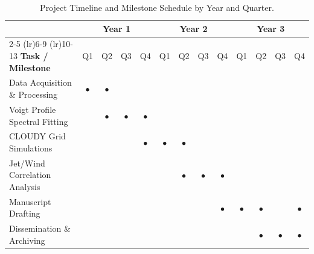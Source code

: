 \begin{table}[htbp]
  \centering
  \caption{Project Timeline and Milestone Schedule by Year and Quarter.}
  \label{tab:timeline}
  \small
  \begin{tabular}{l *{12}{c}}
    \toprule
    & \multicolumn{4}{c}{\textbf{Year 1}} & \multicolumn{4}{c}{\textbf{Year 2}} & \multicolumn{4}{c}{\textbf{Year 3}} \\
    \cmidrule(lr){2-5} \cmidrule(lr){6-9} \cmidrule(lr){10-13}
    \textbf{Task / Milestone} & Q1 & Q2 & Q3 & Q4 & Q1 & Q2 & Q3 & Q4 & Q1 & Q2 & Q3 & Q4 \\
    \midrule
    Data Acquisition \& Processing & $\bullet$ & $\bullet$ & & & & & & & & & & \\
    Voigt Profile Spectral Fitting & & $\bullet$ & $\bullet$ & $\bullet$ & & & & & & & & \\
    CLOUDY Grid Simulations & & & & $\bullet$ & $\bullet$ & $\bullet$ & & & & & & \\
    Jet/Wind Correlation Analysis & & & & & & $\bullet$ & $\bullet$ & $\bullet$ & & & & \\
    Manuscript Drafting & & & & & & & & $\bullet$ & $\bullet$ & $\bullet$ & & $\bullet$ \\
    Dissemination \& Archiving & & & & & & & & & & $\bullet$ & $\bullet$ & $\bullet$ \\
    \bottomrule
  \end{tabular}
\end{table}
